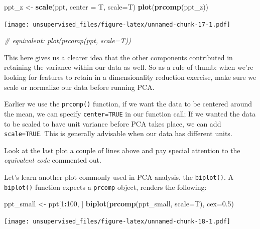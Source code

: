 \documentclass[]{article}
\newenvironment{Shaded}{\begin{snugshade}}{\end{snugshade}}
\newcommand{\CommentTok}[1]{\textcolor[rgb]{0.56,0.35,0.01}{\textit{#1}}}
\newcommand{\DataTypeTok}[1]{\textcolor[rgb]{0.13,0.29,0.53}{#1}}
\newcommand{\DecValTok}[1]{\textcolor[rgb]{0.00,0.00,0.81}{#1}}
\newcommand{\FloatTok}[1]{\textcolor[rgb]{0.00,0.00,0.81}{#1}}
\newcommand{\KeywordTok}[1]{\textcolor[rgb]{0.13,0.29,0.53}{\textbf{#1}}}
\newcommand{\NormalTok}[1]{#1}
\newcommand{\OperatorTok}[1]{\textcolor[rgb]{0.81,0.36,0.00}{\textbf{#1}}}
\newcommand{\StringTok}[1]{\textcolor[rgb]{0.31,0.60,0.02}{#1}}
\begin{document}
\begin{Shaded}
\begin{Highlighting}[]
\NormalTok{ppt_z <-}\StringTok{ }\KeywordTok{scale}\NormalTok{(ppt, }\DataTypeTok{center =}\NormalTok{ T, }\DataTypeTok{scale=}\NormalTok{T)}
\KeywordTok{plot}\NormalTok{(}\KeywordTok{prcomp}\NormalTok{(ppt_z))}
\end{Highlighting}
\end{Shaded}

\texttt{[image: unsupervised\_files/figure-latex/unnamed-chunk-17-1.pdf]}

\begin{Shaded}
\begin{Highlighting}[]
\CommentTok{# equivalent: plot(prcomp(ppt, scale=T))}
\end{Highlighting}
\end{Shaded}

This here gives us a clearer idea that the other components contributed
in retaining the variance within our data as well. So as a rule of
thumb: when we're looking for features to retain in a dimensionality
reduction exercise, make sure we scale or normalize our data before
running PCA.

Earlier we use the \texttt{prcomp()} function, if we want the data to be
centered around the mean, we can specify \texttt{center=TRUE} in our
function call; If we wanted the data to be scaled to have unit variance
before PCA takes place, we can add \texttt{scale=TRUE}. This is
generally advisable when our data has different units.

Look at the last plot a couple of lines above and pay special attention
to the \emph{equivalent code} commented out.

Let's learn another plot commonly used in PCA analysis, the
\texttt{biplot()}. A \texttt{biplot()} function expects a
\texttt{prcomp} object, renders the following:

\begin{Shaded}
\begin{Highlighting}[]
\NormalTok{ppt_small <-}\StringTok{ }\NormalTok{ppt[}\DecValTok{1}\OperatorTok{:}\DecValTok{100}\NormalTok{, ]}
\KeywordTok{biplot}\NormalTok{(}\KeywordTok{prcomp}\NormalTok{(ppt_small, }\DataTypeTok{scale=}\NormalTok{T), }\DataTypeTok{cex=}\FloatTok{0.5}\NormalTok{)}
\end{Highlighting}
\end{Shaded}

\texttt{[image: unsupervised\_files/figure-latex/unnamed-chunk-18-1.pdf]}
\end{document}
